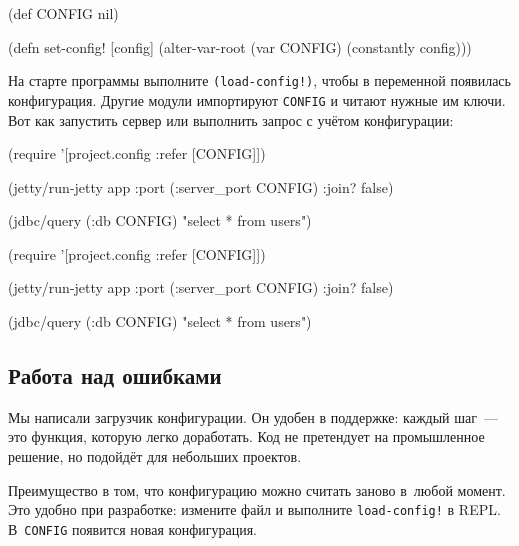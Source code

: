 \else

\begin{english}
  \begin{clojure}
(def CONFIG nil)

(defn set-config!
  [config]
  (alter-var-root (var CONFIG) (constantly config)))
  \end{clojure}
\end{english}

\fi

На старте программы выполните \verb|(load-config!)|, чтобы в переменной
появилась конфигурация. Другие модули импортируют \verb|CONFIG| и читают
нужные им ключи. Вот как запустить сервер или выполнить запрос с учётом
конфигурации:


\ifx\devicetype\mobile

\begin{english}
  \begin{clojure}
(require
  '[project.config :refer [CONFIG]])

(jetty/run-jetty app
  {:port (:server_port CONFIG)
   :join? false})

(jdbc/query (:db CONFIG)
  "select * from users")
  \end{clojure}
\end{english}

\else

\begin{english}
  \begin{clojure}
(require '[project.config :refer [CONFIG]])

(jetty/run-jetty app {:port (:server_port CONFIG)
                      :join? false})

(jdbc/query (:db CONFIG) "select * from users")
  \end{clojure}
\end{english}

\fi

\subsection{Работа над ошибками}

Мы написали загрузчик конфигурации. Он удобен в поддержке: каждый шаг~--- это
функция, которую легко доработать. Код не претендует на промышленное решение, но
подойдёт для небольших проектов.

Преимущество в том, что конфигурацию можно считать заново в~любой момент. Это
удобно при разработке: измените файл и выполните \verb|load-config!| в
REPL. В~\verb|CONFIG| появится новая конфигурация.


